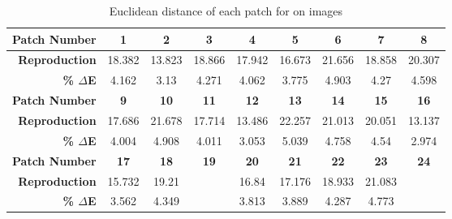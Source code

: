 \begin{table}[H]
  \caption{Euclidean distance of each patch for on images }
  \begin{center}
    \begin{tabularx}{\textwidth}{r c c c c c c c c}
    \toprule
        \textbf{Patch Number} & \textbf{1} & \textbf{2} & \textbf{3} & \textbf{4} & \textbf{5} & \textbf{6} & \textbf{7} & \textbf{8}\\ \midrule 
        \textbf{Reproduction} &18.382 &13.823 &18.866 &17.942 &16.673 &21.656 &18.858 &20.307\\ 
        \textbf{\textbf{\% $\Delta$E}} &4.162 &3.13 &4.271 &4.062 &3.775 &4.903 &4.27 &4.598\\ \midrule 
        \textbf{Patch Number} & \textbf{9} & \textbf{10} & \textbf{11} & \textbf{12} & \textbf{13} & \textbf{14} & \textbf{15} & \textbf{16}\\ \midrule 
        \textbf{Reproduction} &17.686 &21.678 &17.714 &13.486 &22.257 &21.013 &20.051 &13.137\\ 
        \textbf{\textbf{\% $\Delta$E}} &4.004 &4.908 &4.011 &3.053 &5.039 &4.758 &4.54 &2.974\\ \midrule 
        \textbf{Patch Number} & \textbf{17} & \textbf{18} & \textbf{19} & \textbf{20} & \textbf{21} & \textbf{22} & \textbf{23} & \textbf{24}\\ \midrule 
        \textbf{Reproduction} &15.732 &19.21 &\cellcolor{colorgreen}{8.956} &16.84 &17.176 &18.933 &21.083 &\cellcolor{colorred}{26.841}\\ 
        \textbf{\textbf{\% $\Delta$E}} &3.562 &4.349 &\cellcolor{colorgreen}{2.028} &3.813 &3.889 &4.287 &4.773 &\cellcolor{colorred}{6.077}\\ \midrule 
    \bottomrule
    \end{tabularx}
  \end{center}
\end{table}
